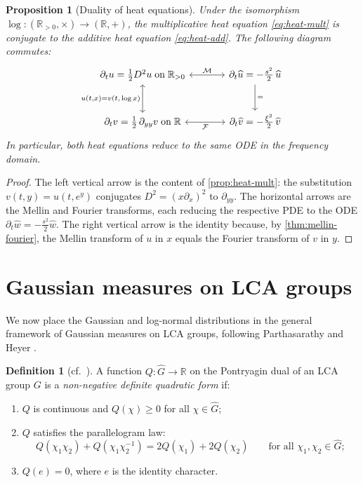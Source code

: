 \documentclass[12pt]{amsart}
\newtheorem{proposition}[theorem]{Proposition}
\theoremstyle{definition}
\newtheorem{definition}[theorem]{Definition}
\theoremstyle{remark}
\newcommand{\R}{\mathbb{R}}
\newcommand{\Rpos}{\mathbb{R}_{>0}}
\newcommand{\cF}{\mathcal{F}}
\newcommand{\cM}{\mathcal{M}}
\begin{document}
\begin{proposition}[Duality of heat equations]\label{prop:heat-duality}
Under the isomorphism $\log : (\Rpos, \times) \to (\R, +)$, the multiplicative heat equation \eqref{eq:heat-mult} is conjugate to the additive heat equation \eqref{eq:heat-add}. The following diagram commutes:
\begin{equation}\label{eq:cd-heat}
\begin{tikzcd}[column sep=large, row sep=large]
\partial_t u = \tfrac{1}{2}D^2 u \;\text{on}\; \Rpos \arrow[r, leftrightarrow, "\cM"] \arrow[d, leftrightarrow, "u(t{,}x) {=} v(t{,}\log x)"'] & \partial_t \widehat{u} = -\tfrac{s^2}{2}\,\widehat{u} \arrow[d, "="] \\
\partial_t v = \tfrac{1}{2}\,\partial_{yy} v \;\text{on}\; \R \arrow[r, leftrightarrow, "\cF"'] & \partial_t \widehat{v} = -\tfrac{\xi^2}{2}\,\widehat{v}
\end{tikzcd}
\end{equation}
In particular, both heat equations reduce to the same ODE in the frequency domain.
\end{proposition}

\begin{proof}
The left vertical arrow is the content of \cref{prop:heat-mult}: the substitution $v(t,y) = u(t, e^y)$ conjugates $D^2 = (x\partial_x)^2$ to $\partial_{yy}$. The horizontal arrows are the Mellin and Fourier transforms, each reducing the respective PDE to the ODE $\partial_t \widehat{w} = -\frac{s^2}{2}\widehat{w}$. The right vertical arrow is the identity because, by \cref{thm:mellin-fourier}, the Mellin transform of $u$ in $x$ equals the Fourier transform of $v$ in $y$.
\end{proof}

\section{Gaussian measures on LCA groups}

We now place the Gaussian and log-normal distributions in the general framework of Gaussian measures on LCA groups, following Parthasarathy \cite{Parthasarathy} and Heyer \cite{Heyer}.

\begin{definition}[{cf.\ \cite[Definition~VI.3.1]{Parthasarathy}}]\label{def:quadratic}
A function $Q : \widehat{G} \to \R$ on the Pontryagin dual of an LCA group $G$ is a \emph{non-negative definite quadratic form} if:
\begin{enumerate}[label=(\roman*)]
\item $Q$ is continuous and $Q(\chi) \geq 0$ for all $\chi \in \widehat{G}$;
\item $Q$ satisfies the parallelogram law:
\[
Q(\chi_1 \chi_2) + Q(\chi_1 \chi_2^{-1}) = 2Q(\chi_1) + 2Q(\chi_2) \qquad \text{for all } \chi_1, \chi_2 \in \widehat{G};
\]
\item $Q(e) = 0$, where $e$ is the identity character.
\end{enumerate}
\end{definition}
\end{document}
